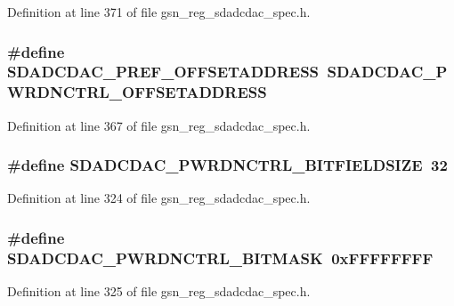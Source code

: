 Definition at line 371 of file gsn\_\-reg\_\-sdadcdac\_\-spec.h.

\hypertarget{a00569_ad26c99def4dd9cb0c12faee693774aa4}{
\subsubsection[{SDADCDAC\_\-PREF\_\-OFFSETADDRESS}]{\setlength{\rightskip}{0pt plus 5cm}\#define SDADCDAC\_\-PREF\_\-OFFSETADDRESS~SDADCDAC\_\-PWRDNCTRL\_\-OFFSETADDRESS}}
\label{a00569_ad26c99def4dd9cb0c12faee693774aa4}


Definition at line 367 of file gsn\_\-reg\_\-sdadcdac\_\-spec.h.

\hypertarget{a00569_a00baba02e48c2f36580168f06ff39942}{
\subsubsection[{SDADCDAC\_\-PWRDNCTRL\_\-BITFIELDSIZE}]{\setlength{\rightskip}{0pt plus 5cm}\#define SDADCDAC\_\-PWRDNCTRL\_\-BITFIELDSIZE~32}}
\label{a00569_a00baba02e48c2f36580168f06ff39942}


Definition at line 324 of file gsn\_\-reg\_\-sdadcdac\_\-spec.h.

\hypertarget{a00569_a3ce81cb19282ddad2037b735c1c7608d}{
\subsubsection[{SDADCDAC\_\-PWRDNCTRL\_\-BITMASK}]{\setlength{\rightskip}{0pt plus 5cm}\#define SDADCDAC\_\-PWRDNCTRL\_\-BITMASK~0xFFFFFFFF}}
\label{a00569_a3ce81cb19282ddad2037b735c1c7608d}


Definition at line 325 of file gsn\_\-reg\_\-sdadcdac\_\-spec.h.

